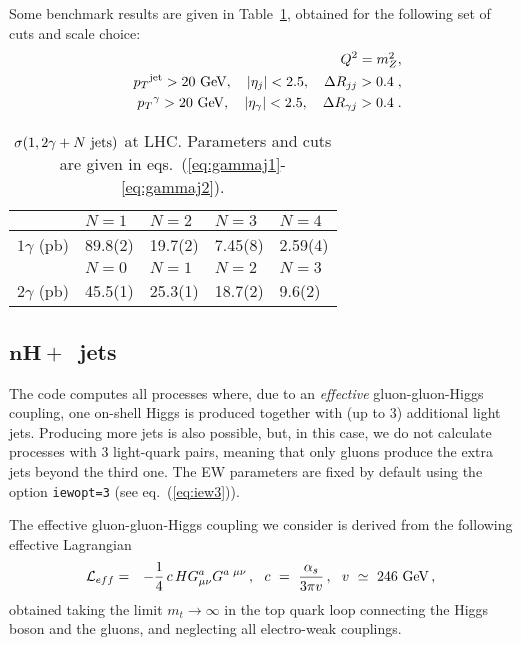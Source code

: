 \documentclass[paper]{JHEP3}
\newcommand{\gev}{\mbox{GeV}}
\newcommand{\ccaption}[2]{
    \begin{center}
    \parbox{0.85\textwidth}{
      \caption[#1]{\small{{#2}}}
      }
    \end{center}
    }
\def    \ba             {\begin{eqnarray}}
\def    \ea             {\end{eqnarray}}
\def    \frac           #1#2{{#1 \over #2}}
\def    \gev            {\mbox{$\mathrm{GeV}$}}
\def    \mZsq             {\mbox{$m_Z^2$} }
\def    \pt             {\mbox{$p_T$}}
\begin{document}
Some benchmark results are given in Table~\ref{tab:gammajxs}, obtained
for the following set of cuts and scale choice:
\ba \label{eq:gammaj1}
&& Q^2 = \mZsq,
\\
        && \pt^{\rm jet}>20~\gev, \quad \vert \eta_j\vert < 2.5, \quad \Delta
        R_{jj} >0.4 \; ,
\\
        && \pt^{\rm \gamma}>20~\gev, \quad \vert \eta_\gamma\vert < 2.5, \quad \Delta R_{\gamma j} >0.4 \; .
\label{eq:gammaj2}
\ea

{\renewcommand{\arraystretch}{1.2}
\begin{table}
\begin{center}
\begin{tabular}{||l|l|l|l|l||}\hline
 & $N = 1$  & 
$N = 2$ & $N = 3$ & $N = 4$ \\ 
\hline
$1\gamma$ (pb)  & 89.8(2)  & 19.7(2)  & 7.45(8) & 2.59(4) \\ 
\hline
 & $N = 0$  & 
$N = 1$ & $N = 2$ & $N = 3$ \\ 
\hline
$2\gamma$ (pb)  & 45.5(1)  & 25.3(1)  & 18.7(2) & 9.6(2) \\ 
\hline
\hline
\end{tabular}            
\ccaption{}{\label{tab:gammajxs} $\sigma(1,2\gamma + N~{\rm jets})$
at LHC. Parameters and cuts are given
in eqs.~(\ref{eq:gammaj1}-\ref{eq:gammaj2}).}
\end{center}
\end{table} }

\subsection{$\mathbf{n H+}$~jets}
\label{hjet}
The code computes all processes where, due to an {\em effective}
gluon-gluon-Higgs coupling, one on-shell Higgs 
is produced together with (up to 3) additional light jets.
Producing more jets is also possible, but, in this case,
we do not calculate processes with 3 light-quark pairs, meaning that
only gluons produce the extra jets beyond the third one.
The EW parameters are fixed by default using the option {\tt iewopt=3}
(see eq.~(\ref{eq:iew3})).

The effective gluon-gluon-Higgs coupling we consider 
is derived from the following effective Lagrangian
\begin{eqnarray}
{\cal L}_{eff} &=& - \frac{1}{4}\,c\, 
H G^a_{\mu \nu} G^{a\,\, \mu \nu}\,,~~
 c  ~=~ \frac{\alpha_s}{3 \pi v}\,,~~v~\simeq~246~{\rm GeV}\,,
\end{eqnarray}
obtained taking the limit $m_t \to \infty$ in the top quark loop 
connecting the Higgs boson and the gluons, and 
neglecting all electro-weak couplings.
\end{document}
